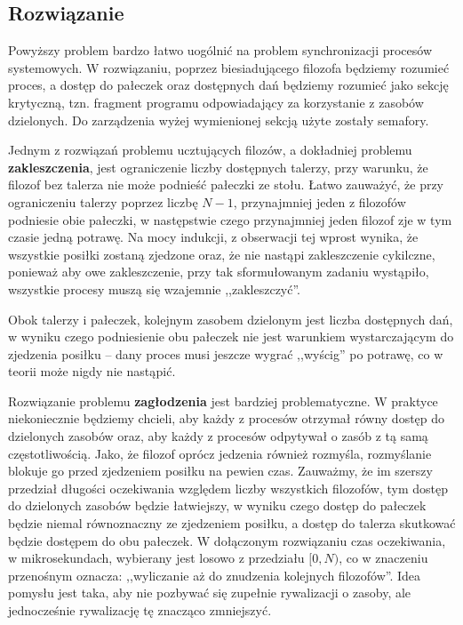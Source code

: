 \documentclass{article}
\begin{document}
\subsection*{Rozwiązanie}

Powyższy problem bardzo łatwo uogólnić na problem synchronizacji procesów systemowych. W rozwiązaniu, poprzez biesiadującego filozofa będziemy rozumieć proces, a dostęp do pałeczek oraz dostępnych dań będziemy rozumieć jako sekcję krytyczną, tzn. fragment programu odpowiadający za korzystanie z zasobów dzielonych.  Do zarządzenia wyżej wymienionej sekcją użyte zostały semafory.\bigskip

Jednym z rozwiązań problemu ucztujących filozów, a dokładniej problemu \textbf{zakleszczenia}, jest ograniczenie liczby dostępnych talerzy, przy warunku, że filozof bez talerza nie może podnieść pałeczki ze stołu. Łatwo zauważyć, że przy ograniczeniu talerzy poprzez liczbę $N-1$, przynajmniej jeden z filozofów podniesie obie pałeczki, w następstwie czego przynajmniej jeden filozof zje w tym czasie jedną potrawę. Na mocy indukcji, z obserwacji tej wprost wynika, że wszystkie posiłki zostaną zjedzone oraz, że nie nastąpi zakleszczenie cykilczne, ponieważ aby owe zakleszczenie, przy tak sformułowanym zadaniu wystąpiło, wszystkie procesy muszą się wzajemnie ,,zakleszczyć''. 

\bigskip

Obok talerzy i pałeczek, kolejnym zasobem dzielonym jest liczba dostępnych dań, w wyniku czego podniesienie obu pałeczek nie jest warunkiem wystarczającym do zjedzenia posiłku -- dany proces musi jeszcze wygrać ,,wyścig'' po potrawę, co w teorii może nigdy nie nastąpić. 

Rozwiązanie problemu \textbf{zagłodzenia} jest bardziej problematyczne. W praktyce niekoniecznie będziemy chcieli, aby każdy z procesów otrzymał równy dostęp do dzielonych zasobów oraz, aby każdy z procesów odpytywał o zasób z tą samą częstotliwością. Jako, że filozof oprócz jedzenia również rozmyśla, rozmyślanie blokuje go przed zjedzeniem posiłku na pewien czas. Zauważmy, że im szerszy przedział długości oczekiwania względem liczby wszystkich filozofów, tym dostęp do dzielonych zasobów będzie łatwiejszy, w wyniku czego dostęp do pałeczek będzie niemal równoznaczny ze zjedzeniem posiłku, a dostęp do talerza skutkować będzie dostępem do obu pałeczek. W dołączonym rozwiązaniu czas oczekiwania, w mikrosekundach, wybierany jest losowo z przedziału $[0,N)$, co w znaczeniu przenośnym oznacza: ,,wyliczanie aż do znudzenia kolejnych filozofów''. Idea pomysłu jest taka, aby nie pozbywać się zupełnie rywalizacji o zasoby, ale jednocześnie rywalizację tę znacząco zmniejszyć.
\end{document}
